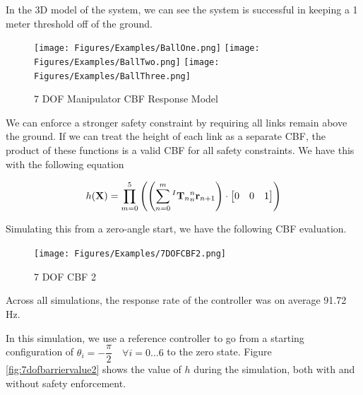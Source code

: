 \noindent In the 3D model of the system, we can see the system is successful in keeping a 1 meter threshold off of the ground.

\begin{figure}[H]
    \centering
    \texttt{[image: Figures/Examples/BallOne.png]}
          \texttt{[image: Figures/Examples/BallTwo.png]}
          \texttt{[image: Figures/Examples/BallThree.png]}
          
    \caption{7 DOF Manipulator CBF Response Model}
    \label{fig:7DOFBall1}
    
\end{figure}

\noindent We can enforce a stronger safety constraint by requiring all links remain above the ground. If we can treat the height of each link as a separate CBF, the product of these functions is a valid CBF for all safety constraints. We have this with the following equation

\begin{align}
    h(\mathbf{X}) =  \prod_{m = 0}^5 \left ( \left (\sum_{n=0}^m {^I\mathbf{T}_n}{^n_n\mathbf{r}_{n+1}} \right) \cdot \begin{bmatrix} 0 & 0 & 1\end{bmatrix} \right )
\end{align}

\noindent Simulating this from a zero-angle start, we have the following CBF evaluation.

\begin{figure}[H]
    \centering
    \texttt{[image: Figures/Examples/7DOFCBF2.png]}
    \caption{7 DOF CBF 2}
    \label{fig:7dofcbf1}
\end{figure}

\noindent Across all simulations, the response rate of the controller was on average 91.72 Hz.

\noindent In this simulation, we use a reference controller to go from a starting configuration of $\theta_i = -\dfrac{\pi}{2} \quad \forall i= 0\hdots6$ to the zero state. Figure \ref{fig:7dofbarriervalue2} shows the value of $h$ during the simulation, both with and without safety enforcement.

